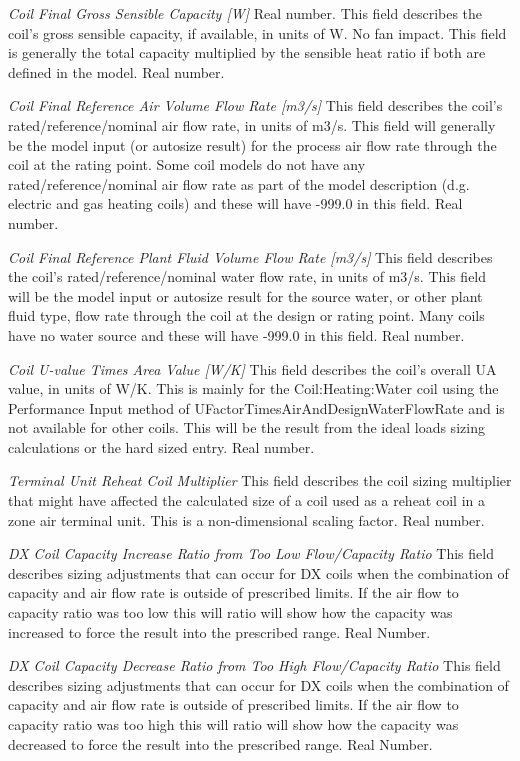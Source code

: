 \emph{Coil Final Gross Sensible Capacity [W]} Real number. This field describes the coil's gross sensible capacity, if available, in units of W. No fan impact.  This field is generally the total capacity multiplied by the sensible heat ratio if both are defined in the model. Real number.

\emph{Coil Final Reference Air Volume Flow Rate [m3/s]}  This field describes the coil's rated/reference/nominal air flow rate, in units of m3/s.  This field will generally be the model input (or autosize result) for the process air flow rate through the coil at the rating point.  Some coil models do not have any rated/reference/nominal air flow rate as part of the model description (d.g. electric and gas heating coils) and these will have -999.0 in this field. Real number. 

\emph{Coil Final Reference Plant Fluid Volume Flow Rate [m3/s]}  This field describes the coil's rated/reference/nominal water flow rate, in units of m3/s.  This field will be the model input or autosize result for the source water, or other plant fluid type, flow rate through the coil at the design or rating point.  Many coils have no water source and these will have -999.0 in this field.  Real number.

\emph{Coil U-value Times Area Value [W/K]} This field describes the coil's overall UA value, in units of W/K.  This is mainly for the Coil:Heating:Water coil using the Performance Input method of UFactorTimesAirAndDesignWaterFlowRate and is not available for other coils.  This will be the result from the ideal loads sizing calculations or the hard sized entry.  Real number.

\emph{Terminal Unit Reheat Coil Multiplier}  This field describes the coil sizing multiplier that might have affected the calculated size of a coil used as a reheat coil in a zone air terminal unit.  This is a non-dimensional scaling factor.  Real number.

\emph{DX Coil Capacity Increase Ratio from Too Low Flow/Capacity Ratio}  This field describes sizing adjustments that can occur for DX coils when the combination of capacity and air flow rate is outside of prescribed limits.  If the air flow to capacity ratio was too low this will ratio will show how the capacity was increased to force the result into the prescribed range.  Real Number.

\emph{DX Coil Capacity Decrease Ratio from Too High Flow/Capacity Ratio}  This field describes sizing adjustments that can occur for DX coils when the combination of capacity and air flow rate is outside of prescribed limits.  If the air flow to capacity ratio was too high this will ratio will show how the capacity was decreased to force the result into the prescribed range.  Real Number.

